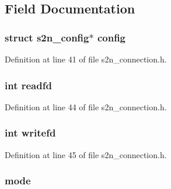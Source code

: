 \subsection{Field Documentation}
\subsubsection[{\texorpdfstring{config}{config}}]{\setlength{\rightskip}{0pt plus 5cm}struct {\bf s2n\+\_\+config}$\ast$ config}\hypertarget{structs2n__connection_a7d70bb7bed95daae1233293126bb9523}{}\label{structs2n__connection_a7d70bb7bed95daae1233293126bb9523}


Definition at line 41 of file s2n\+\_\+connection.\+h.

\subsubsection[{\texorpdfstring{readfd}{readfd}}]{\setlength{\rightskip}{0pt plus 5cm}int readfd}\hypertarget{structs2n__connection_ab8b1e66f9a7b17fa4541b1733b87e011}{}\label{structs2n__connection_ab8b1e66f9a7b17fa4541b1733b87e011}


Definition at line 44 of file s2n\+\_\+connection.\+h.

\subsubsection[{\texorpdfstring{writefd}{writefd}}]{\setlength{\rightskip}{0pt plus 5cm}int writefd}\hypertarget{structs2n__connection_abb118879baad1066df4d078fdb2da908}{}\label{structs2n__connection_abb118879baad1066df4d078fdb2da908}


Definition at line 45 of file s2n\+\_\+connection.\+h.

\subsubsection[{\texorpdfstring{mode}{mode}}]{ mode}\hypertarget{structs2n__connection_a080df3a36b82d7a11f200fdf1a38f360}{}\label{structs2n__connection_a080df3a36b82d7a11f200fdf1a38f360}



